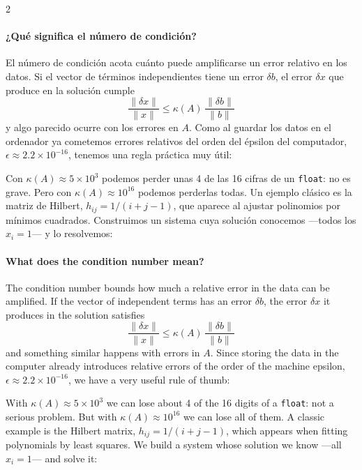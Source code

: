 \begin{paracol}{2}
\paragraph{¿Qué significa el número de condición?} El número de condición acota cuánto puede amplificarse un error relativo en los datos. Si el vector de términos independientes tiene un error $\delta b$, el error $\delta x$ que produce en la solución cumple
\begin{equation*}
\frac{\lVert \delta x\rVert}{\lVert x\rVert} \leq \kappa(A)\, \frac{\lVert \delta b\rVert}{\lVert b\rVert}
\end{equation*}
y algo parecido ocurre con los errores en $A$. Como al guardar los datos en el ordenador ya cometemos errores relativos del orden del épsilon del computador, $\epsilon\approx 2.2\times 10^{-16}$, tenemos una regla práctica muy útil:

\begin{center}
\end{center}

Con $\kappa(A)\approx 5\times 10^3$ podemos perder unas 4 de las 16 cifras de un \texttt{float}: no es grave. Pero con $\kappa(A)\approx 10^{16}$ podemos perderlas todas. Un ejemplo clásico es la matriz de Hilbert, $h_{ij}=1/(i+j-1)$, que aparece al ajustar polinomios por mínimos cuadrados. Construimos un sistema cuya solución conocemos ---todos los $x_i=1$--- y lo resolvemos:

\switchcolumn
\paragraph{What does the condition number mean?} The condition number bounds how much a relative error in the data can be amplified. If the vector of independent terms has an error $\delta b$, the error $\delta x$ it produces in the solution satisfies
\begin{equation*}
\frac{\lVert \delta x\rVert}{\lVert x\rVert} \leq \kappa(A)\, \frac{\lVert \delta b\rVert}{\lVert b\rVert}
\end{equation*}
and something similar happens with errors in $A$. Since storing the data in the computer already introduces relative errors of the order of the machine epsilon, $\epsilon\approx 2.2\times 10^{-16}$, we have a very useful rule of thumb:

\begin{center}
\end{center}

With $\kappa(A)\approx 5\times 10^3$ we can lose about 4 of the 16 digits of a \texttt{float}: not a serious problem. But with $\kappa(A)\approx 10^{16}$ we can lose all of them. A classic example is the Hilbert matrix, $h_{ij}=1/(i+j-1)$, which appears when fitting polynomials by least squares. We build a system whose solution we know ---all $x_i=1$--- and solve it:
\end{paracol}

